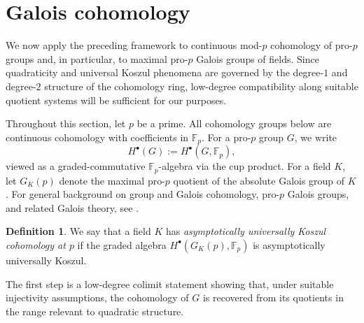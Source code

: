 \documentclass[11pt]{amsart}
\numberwithin{equation}{section}
\theoremstyle{definition}
\newtheorem{definition}[theorem]{Definition}
\begin{document}
	
	
	
	
	
	
	\section{Galois cohomology}
	\label{sec:galois}
	
	
	We now apply the preceding framework to continuous mod-\(p\) cohomology of pro-\(p\) groups and, in particular, to maximal pro-\(p\) Galois groups of fields. Since quadraticity and universal Koszul phenomena are governed by the degree-\(1\) and degree-\(2\) structure of the cohomology ring, low-degree compatibility along suitable quotient systems will be sufficient for our purposes.
	
	Throughout this section, let \(p\) be a prime. All cohomology groups below are continuous cohomology with coefficients in \(\mathbb{F}_p\). For a pro-\(p\) group \(G\), we write 
	\[H^\bullet(G):=H^\bullet(G,\mathbb{F}_p),\]
	viewed as a graded-commutative \(\mathbb{F}_p\)-algebra via the cup product. For a field \(K\), let \(G_K(p)\) denote the maximal pro-\(p\) quotient of the absolute Galois group of \(K\). For general background on group and Galois cohomology, pro-\(p\) Galois groups, and related Galois theory, see \cite{Brown,Koch,NeukirchSchmidtWingberg,SerreGaloisCohomology,SerreTopics}.
	
	\begin{definition}
		We say that a field \(K\) has \emph{asymptotically universally Koszul cohomology at \(p\)} if the graded algebra $H^\bullet(G_K(p),\mathbb{F}_p)$ is asymptotically universally Koszul.
	\end{definition}
	
	The first step is a low-degree colimit statement showing that, under suitable injectivity assumptions, the cohomology of \(G\) is recovered from its quotients in the range relevant to quadratic structure.
	
\end{document}
